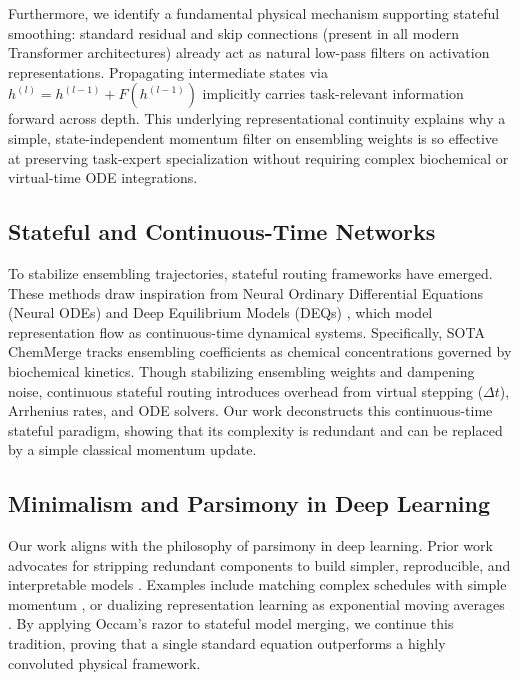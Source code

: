 Furthermore, we identify a fundamental physical mechanism supporting stateful smoothing: standard residual and skip connections (present in all modern Transformer architectures) already act as natural low-pass filters on activation representations. Propagating intermediate states via $h^{(l)} = h^{(l-1)} + F(h^{(l-1)})$ implicitly carries task-relevant information forward across depth. This underlying representational continuity explains why a simple, state-independent momentum filter on ensembling weights is so effective at preserving task-expert specialization without requiring complex biochemical or virtual-time ODE integrations.

\subsection{Stateful and Continuous-Time Networks}
To stabilize ensembling trajectories, stateful routing frameworks have emerged. These methods draw inspiration from Neural Ordinary Differential Equations (Neural ODEs) \cite{chen2018neural} and Deep Equilibrium Models (DEQs) \cite{bai2019deep}, which model representation flow as continuous-time dynamical systems. Specifically, SOTA ChemMerge \cite{chemmerge} tracks ensembling coefficients as chemical concentrations governed by biochemical kinetics. Though stabilizing ensembling weights and dampening noise, continuous stateful routing introduces overhead from virtual stepping ($\Delta t$), Arrhenius rates, and ODE solvers. Our work deconstructs this continuous-time stateful paradigm, showing that its complexity is redundant and can be replaced by a simple classical momentum update.

\subsection{Minimalism and Parsimony in Deep Learning}
Our work aligns with the philosophy of parsimony in deep learning. Prior work advocates for stripping redundant components to build simpler, reproducible, and interpretable models \cite{mitchell1980need, duda2000pattern}. Examples include matching complex schedules with simple momentum \cite{polyak1964some, nesterov1983method}, or dualizing representation learning as exponential moving averages \cite{grill2020byol, he2020moco}. By applying Occam's razor to stateful model merging, we continue this tradition, proving that a single standard equation outperforms a highly convoluted physical framework.
